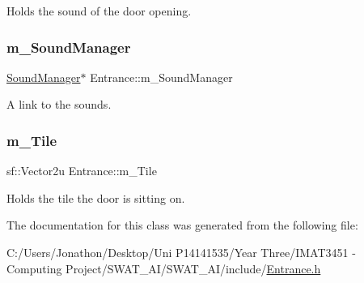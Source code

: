 Holds the sound of the door opening. 

\mbox{\label{class_entrance_aeef1bb9f20ecef276dddaaa2a9bc5938}} 
\subsubsection{\texorpdfstring{m\+\_\+\+Sound\+Manager}{m\_SoundManager}}
{\footnotesize\ttfamily \hyperlink{class_sound_manager}{Sound\+Manager}$\ast$ Entrance\+::m\+\_\+\+Sound\+Manager\hspace{0.3cm}{\ttfamily [private]}}



A link to the sounds. 

\mbox{\label{class_entrance_afdedd2f9348968422d822e544abaae98}} 
\subsubsection{\texorpdfstring{m\+\_\+\+Tile}{m\_Tile}}
{\footnotesize\ttfamily sf\+::\+Vector2u Entrance\+::m\+\_\+\+Tile\hspace{0.3cm}{\ttfamily [private]}}



Holds the tile the door is sitting on. 



The documentation for this class was generated from the following file\+:\begin{DoxyCompactItemize}
\item 
C\+:/\+Users/\+Jonathon/\+Desktop/\+Uni P14141535/\+Year Three/\+I\+M\+A\+T3451 -\/ Computing Project/\+S\+W\+A\+T\+\_\+\+A\+I/\+S\+W\+A\+T\+\_\+\+A\+I/include/\hyperlink{_entrance_8h}{Entrance.\+h}\end{DoxyCompactItemize}
